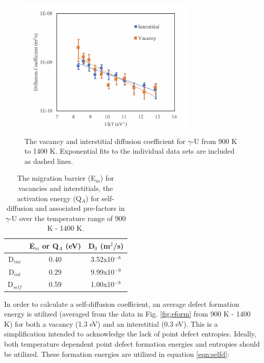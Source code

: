\documentclass[review]{elsarticle}
\begin{document}
 \begin{figure}[h]
 \centering
 \includegraphics[width=0.75\textwidth]{8_diff.png} 
 \caption{The vacancy and interstitial diffusion coefficient for $\gamma$-U from 900 K to 1400 K. Exponential fits to the individual data sets are included as dashed lines.}
 \label{fig:diff}
\end{figure}

\FloatBarrier

\begin{table}[h]
\caption{The migration barrier (E$_m$) for vacancies and interstitials, the activation energy (Q$_A$) for self-diffusion and associated pre-factors in $\gamma$-U over the temperature range of 900 K - 1400 K.}  \label{tab:diff}
\begin{center}
\begin{tabular}{|c|c|c|}
	\hline
	 & E$_m$ or Q$_A$ (eV) & D$_0$ (m$^2$/s) \\
	 \hline
	 D$_{vac}$ & 0.40 & 3.52x10$^{-8}$ \\
	 D$_{int}$ & 0.29 & 9.99x10$^{-9}$ \\
	 D$_{self}$ & 0.59 & 1.00x10$^{-8}$ \\
	 \hline
\end{tabular}
\end{center}
\label{default}
\end{table}

In order to calculate a self-diffusion coefficient, an average defect formation energy is utilized (averaged from the data in Fig. \ref{fig:eform} from 900 K - 1400 K) for both a vacancy (1.3 eV) and an interstitial (0.3 eV). This is a simplification intended to acknowledge the lack of point defect entropies. Ideally, both temperature dependent point defect formation energies and entropies should be utilized. These formation energies are utilized in equation \ref{eqn:selfd}:
\end{document}
